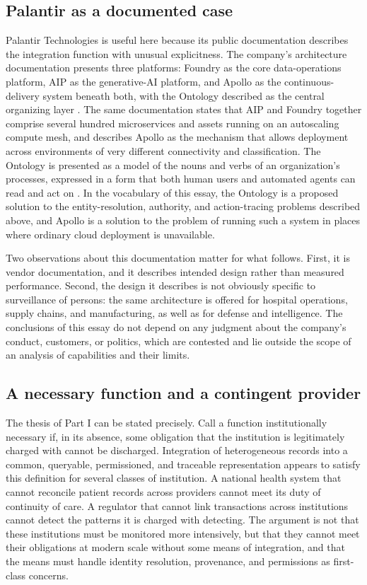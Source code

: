 \documentclass[11pt]{article}
\theoremstyle{plain}
\theoremstyle{definition}
\theoremstyle{remark}
\begin{document}
\subsection{Palantir as a documented case}

Palantir Technologies is useful here because its public documentation describes the integration function with unusual explicitness. The company's architecture documentation presents three platforms: Foundry as the core data-operations platform, AIP as the generative-AI platform, and Apollo as the continuous-delivery system beneath both, with the Ontology described as the central organizing layer \cite{palantirArch}. The same documentation states that AIP and Foundry together comprise several hundred microservices and assets running on an autoscaling compute mesh, and describes Apollo as the mechanism that allows deployment across environments of very different connectivity and classification. The Ontology is presented as a model of the nouns and verbs of an organization's processes, expressed in a form that both human users and automated agents can read and act on \cite{palantirAIP}. In the vocabulary of this essay, the Ontology is a proposed solution to the entity-resolution, authority, and action-tracing problems described above, and Apollo is a solution to the problem of running such a system in places where ordinary cloud deployment is unavailable.

Two observations about this documentation matter for what follows. First, it is vendor documentation, and it describes intended design rather than measured performance. Second, the design it describes is not obviously specific to surveillance of persons: the same architecture is offered for hospital operations, supply chains, and manufacturing, as well as for defense and intelligence. The conclusions of this essay do not depend on any judgment about the company's conduct, customers, or politics, which are contested and lie outside the scope of an analysis of capabilities and their limits.

\subsection{A necessary function and a contingent provider}

The thesis of Part I can be stated precisely. Call a function institutionally necessary if, in its absence, some obligation that the institution is legitimately charged with cannot be discharged. Integration of heterogeneous records into a common, queryable, permissioned, and traceable representation appears to satisfy this definition for several classes of institution. A national health system that cannot reconcile patient records across providers cannot meet its duty of continuity of care. A regulator that cannot link transactions across institutions cannot detect the patterns it is charged with detecting. The argument is not that these institutions must be monitored more intensively, but that they cannot meet their obligations at modern scale without some means of integration, and that the means must handle identity resolution, provenance, and permissions as first-class concerns.
\end{document}
